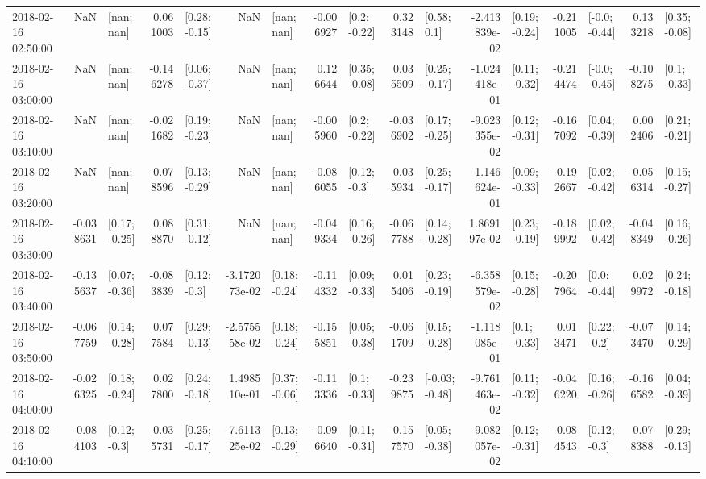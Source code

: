 \begin{tabular}{lrlrlrlrlrlrlrlrl}
2018-02-16 02:50:00 &       NaN &      [nan; nan] &  0.061003 &   [0.28; -0.15] &           NaN &      [nan; nan] & -0.006927 &    [0.2; -0.22] &  0.323148 &     [0.58; 0.1] & -2.413839e-02 &   [0.19; -0.24] & -0.211005 &   [-0.0; -0.44] &  0.133218 &   [0.35; -0.08] \\
2018-02-16 03:00:00 &       NaN &      [nan; nan] & -0.146278 &   [0.06; -0.37] &           NaN &      [nan; nan] &  0.126644 &   [0.35; -0.08] &  0.035509 &   [0.25; -0.17] & -1.024418e-01 &   [0.11; -0.32] & -0.214474 &   [-0.0; -0.45] & -0.108275 &    [0.1; -0.33] \\
2018-02-16 03:10:00 &       NaN &      [nan; nan] & -0.021682 &   [0.19; -0.23] &           NaN &      [nan; nan] & -0.005960 &    [0.2; -0.22] & -0.036902 &   [0.17; -0.25] & -9.023355e-02 &   [0.12; -0.31] & -0.167092 &   [0.04; -0.39] &  0.002406 &   [0.21; -0.21] \\
2018-02-16 03:20:00 &       NaN &      [nan; nan] & -0.078596 &   [0.13; -0.29] &           NaN &      [nan; nan] & -0.086055 &    [0.12; -0.3] &  0.035934 &   [0.25; -0.17] & -1.146624e-01 &   [0.09; -0.33] & -0.192667 &   [0.02; -0.42] & -0.056314 &   [0.15; -0.27] \\
2018-02-16 03:30:00 & -0.038631 &   [0.17; -0.25] &  0.088870 &   [0.31; -0.12] &           NaN &      [nan; nan] & -0.049334 &   [0.16; -0.26] & -0.067788 &   [0.14; -0.28] &  1.869197e-02 &   [0.23; -0.19] & -0.189992 &   [0.02; -0.42] & -0.048349 &   [0.16; -0.26] \\
2018-02-16 03:40:00 & -0.135637 &   [0.07; -0.36] & -0.083839 &    [0.12; -0.3] & -3.172073e-02 &   [0.18; -0.24] & -0.114332 &   [0.09; -0.33] &  0.015406 &   [0.23; -0.19] & -6.358579e-02 &   [0.15; -0.28] & -0.207964 &    [0.0; -0.44] &  0.029972 &   [0.24; -0.18] \\
2018-02-16 03:50:00 & -0.067759 &   [0.14; -0.28] &  0.077584 &   [0.29; -0.13] & -2.575558e-02 &   [0.18; -0.24] & -0.155851 &   [0.05; -0.38] & -0.061709 &   [0.15; -0.28] & -1.118085e-01 &    [0.1; -0.33] &  0.013471 &    [0.22; -0.2] & -0.073470 &   [0.14; -0.29] \\
2018-02-16 04:00:00 & -0.026325 &   [0.18; -0.24] &  0.027800 &   [0.24; -0.18] &  1.498510e-01 &   [0.37; -0.06] & -0.113336 &    [0.1; -0.33] & -0.239875 &  [-0.03; -0.48] & -9.761463e-02 &   [0.11; -0.32] & -0.046220 &   [0.16; -0.26] & -0.166582 &   [0.04; -0.39] \\
2018-02-16 04:10:00 & -0.084103 &    [0.12; -0.3] &  0.035731 &   [0.25; -0.17] & -7.611325e-02 &   [0.13; -0.29] & -0.096640 &   [0.11; -0.31] & -0.157570 &   [0.05; -0.38] & -9.082057e-02 &   [0.12; -0.31] & -0.084543 &    [0.12; -0.3] &  0.078388 &   [0.29; -0.13] \\

\end{tabular}
